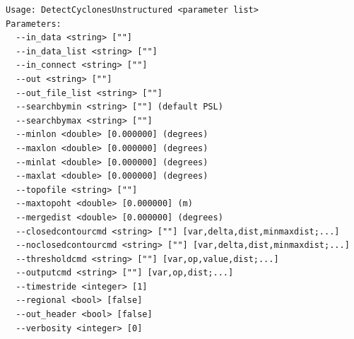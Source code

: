 \documentclass[gmdd, hvmath, online]{copernicus_discussions}
\begin{document}
\begin{verbatim}
Usage: DetectCyclonesUnstructured <parameter list>
Parameters:
  --in_data <string> [""] 
  --in_data_list <string> [""]
  --in_connect <string> [""] 
  --out <string> [""] 
  --out_file_list <string> [""]
  --searchbymin <string> [""] (default PSL)
  --searchbymax <string> [""] 
  --minlon <double> [0.000000] (degrees)
  --maxlon <double> [0.000000] (degrees)
  --minlat <double> [0.000000] (degrees)
  --maxlat <double> [0.000000] (degrees)
  --topofile <string> [""] 
  --maxtopoht <double> [0.000000] (m)
  --mergedist <double> [0.000000] (degrees)
  --closedcontourcmd <string> [""] [var,delta,dist,minmaxdist;...]
  --noclosedcontourcmd <string> [""] [var,delta,dist,minmaxdist;...]
  --thresholdcmd <string> [""] [var,op,value,dist;...]
  --outputcmd <string> [""] [var,op,dist;...]
  --timestride <integer> [1] 
  --regional <bool> [false] 
  --out_header <bool> [false] 
  --verbosity <integer> [0] 
\end{verbatim}
\end{document}
